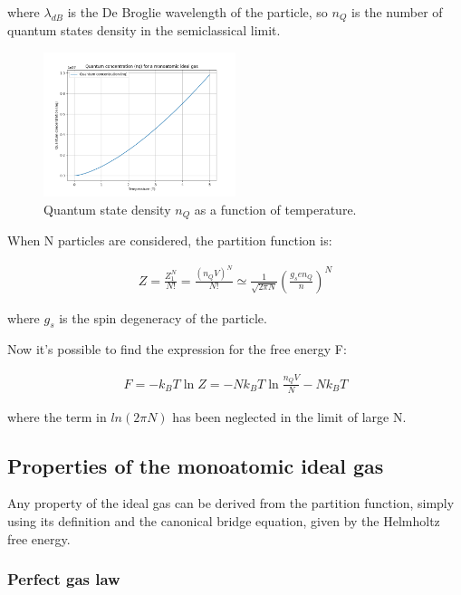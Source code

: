 \documentclass{article}
\begin{document}
where $\lambda_{dB}$ is the De Broglie wavelength of the particle, so $n_Q$ is the number of quantum states density in the semiclassical limit.

\begin{figure}[h]
    \centering
    \includegraphics[width=0.5\textwidth]{images/statistical-physics/nq-monoatomic-ideal-gas.png}
    \caption{Quantum state density $n_Q$ as a function of temperature.}
    \label{fig:nq}
\end{figure}

When N particles are considered, the partition function is:

\begin{align*}
    Z=\frac{Z_1^N}{N!}=\frac{(n_QV)^N}{N!}\simeq \frac{1}{\sqrt{2\pi N}}\left(\frac{g_sen_Q}{n}\right)^N
\end{align*}

where $g_s$ is the spin degeneracy of the particle.

Now it's possible to find the expression for the free energy F:

\begin{align*}
    F=-k_BT\ln{Z}=-Nk_BT\ln{\frac{n_QV}{N}}-Nk_BT
\end{align*}

where the term in $ln(2\pi N)$ has been neglected in the limit of large N.


\subsection{Properties of the monoatomic ideal gas}

Any property of the ideal gas can be derived from the partition function,
simply using its definition and the canonical bridge equation, given by the Helmholtz free energy.

\subsubsection{Perfect gas law}
\end{document}
